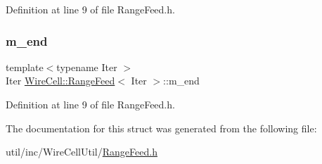 Definition at line 9 of file Range\+Feed.\+h.

\mbox{\label{struct_wire_cell_1_1_range_feed_a679841f5f60d11c174f35d8bc159045e}} 
\subsubsection{\texorpdfstring{m\+\_\+end}{m\_end}}
{\footnotesize\ttfamily template$<$typename Iter $>$ \\
Iter \hyperlink{struct_wire_cell_1_1_range_feed}{Wire\+Cell\+::\+Range\+Feed}$<$ Iter $>$\+::m\+\_\+end}



Definition at line 9 of file Range\+Feed.\+h.



The documentation for this struct was generated from the following file\+:\begin{DoxyCompactItemize}
\item 
util/inc/\+Wire\+Cell\+Util/\hyperlink{_range_feed_8h}{Range\+Feed.\+h}\end{DoxyCompactItemize}
